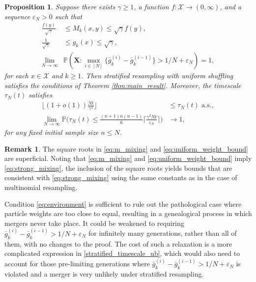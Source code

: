 \documentclass[a4paper,11pt]{article}
\newtheorem{prop}{Proposition}
\theoremstyle{definition}
\newtheorem{rem}{Remark}
\newcommand{\bbP}{\mathbb{P}}
\newcommand{\bfX}{\mathbf{X}}
\newcommand{\calX}{\mathcal{X}}
\begin{document}
\begin{prop}\label{prop:stratified}
Suppose there exists $\gamma \geq 1$, a function $f : \calX \to ( 0, \infty )$, and a sequence $\varepsilon_N > 0$ such that
\begin{align}
\frac{ f( y ) }{ \sqrt{ \gamma } } &\leq M_k( x, y ) \leq \sqrt{ \gamma } f( y ), \label{eq:m_mixing} \\
\frac{ 1 }{ \sqrt{ \gamma } } &\leq g_k( x ) \leq \sqrt{ \gamma }, \label{eq:uniform_weight_bound} \\
\lim_{ N \to \infty } &\bbP( \bfX : \max_{ i \in [ N ] }\{ \bar{ g }_k^{ ( i ) } - \bar{g}_k^{ ( i - 1 ) } \} > 1 / N + \varepsilon_N ) = 1, \label{eq:environment}
\end{align}
for each $x \in \calX$ and $k \geq 1$.
Then stratified resampling with uniform shuffling satisfies the conditions of Theorem \ref{thm:main_result}.
Moreover, the timescale $\tau_N(t)$ satisfies
\begin{align}
\Big\lfloor (1 + o(1)) \frac{N t}{\gamma^4} \Big\rfloor &\leq \tau_N(t) \text{ a.s.}, \label{stratified_timescale_lb}\\
\lim_{N \to \infty} \bbP\Bigg( \tau_N(t) \leq \frac{(n + 1) n (n - 1)}{6} \Big\lceil \frac{\gamma^2 N t}{\varepsilon_N} \Big\rceil \Bigg) &\to 1, \label{stratified_timescale_ub}
\end{align}
for any fixed initial sample size $n \leq N$.
\end{prop}

\begin{rem}
The square roots in \eqref{eq:m_mixing} and \eqref{eq:uniform_weight_bound} are superficial.
Noting that \eqref{eq:m_mixing} and \eqref{eq:uniform_weight_bound} imply \eqref{eq:strong_mixing}, the inclusion of the square roots yields bounds that are consistent with \eqref{eq:strong_mixing} using the same constants as in the case of multinomial resampling.
\end{rem}

Condition \eqref{eq:environment} is sufficient to rule out the pathological case where particle weights are too close to equal, resulting in a genealogical process in which mergers never take place.
It could be weakened to requiring $\bar{ g }_k^{ ( i ) } - \bar{g}_k^{ ( i - 1 ) } > 1 / N + \varepsilon_N$ for infinitely many generations, rather than all of them, with no changes to the proof.
The cost of such a relaxation is a more complicated expression in \eqref{stratified_timescale_ub}, which would also need to account for those pre-limiting generations where $\bar{ g }_k^{ ( i ) } - \bar{g}_k^{ ( i - 1 ) } > 1 / N + \varepsilon_N$ is violated and a merger is very unlikely under stratified resampling.
\end{document}
